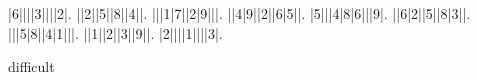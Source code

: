 \begin{sudoku}
|6||||3||||2|.
||2||5||8||4||.
|||1|7||2|9|||.
||4|9||2||6|5||.
|5|||4|8|6|||9|.
||6|2||5||8|3||.
|||5|8||4|1|||.
||1||2||3||9||.
|2||||1||||3|.
\end{sudoku}
\begin{center}
difficult\end{center}